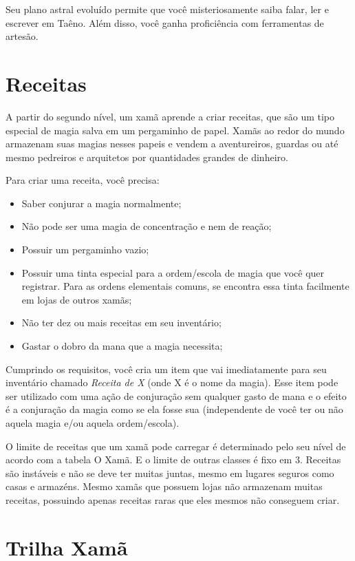 \begin{multicols}{2}
Seu plano astral evoluído permite que você misteriosamente saiba falar, ler e
escrever em Taêno. Além disso, você ganha proficiência com ferramentas de
artesão.

\section*{Receitas}%

A partir do segundo nível, um xamã aprende a criar receitas, que são um tipo
especial de magia salva em um pergaminho de papel. Xamãs ao redor do mundo
armazenam suas magias nesses papeis e vendem a aventureiros, guardas ou até
mesmo pedreiros e arquitetos por quantidades grandes de dinheiro.

Para criar uma receita, você precisa:
\begin{itemize}
    \item Saber conjurar a magia normalmente;
    \item Não pode ser uma magia de concentração e nem de reação;
    \item Possuir um pergaminho vazio;
    \item Possuir uma tinta especial para a ordem/escola de magia que você
            quer registrar. Para as ordens elementais comuns, se encontra essa tinta
        facilmente em lojas de outros xamãs;
    \item Não ter dez ou mais receitas em seu inventário;
    \item Gastar o dobro da mana que a magia necessita;
\end{itemize}

Cumprindo os requisitos, você cria um item que vai imediatamente para seu
inventário chamado \textit{Receita de X} (onde X é o nome da magia). Esse item
pode ser utilizado com uma ação de conjuração sem qualquer gasto de mana e o
efeito é a conjuração da magia como se ela fosse sua (independente de você ter
ou não aquela magia e/ou aquela ordem/escola).

O limite de receitas que um xamã pode carregar é determinado pelo seu nível de
acordo com a tabela O Xamã. E o limite de outras classes é fixo em 3. Receitas
são instáveis e não se deve ter muitas juntas, mesmo em lugares seguros como
casas e armazéns. Mesmo xamãs que possuem lojas não armazenam muitas receitas,
possuindo apenas receitas raras que eles mesmos não conseguem criar.

\section*{Trilha Xamã}


\end{multicols}
